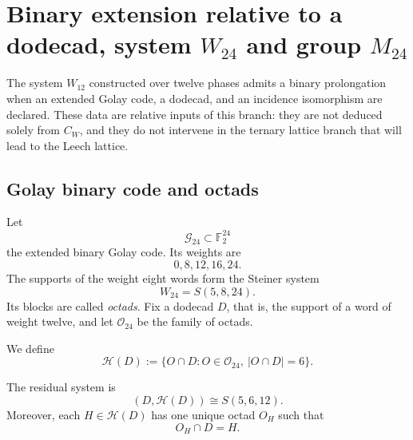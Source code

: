 
\section{Binary extension relative to a dodecad, system \texorpdfstring{\(W_{24}\)}{W24} and group \texorpdfstring{\(M_{24}\)}{M24}}
\label{p12-83-c20-s3:chap:dodecada-w24-m24}

The system \(W_{12}\) constructed over twelve phases admits a binary prolongation
when an extended Golay code, a dodecad, and an incidence
isomorphism are declared. These data are relative inputs of this branch:
they are not deduced solely from \(C_W\), and they do not intervene in the ternary lattice
branch that will lead to the Leech lattice.

\subsection{Golay binary code and octads}

Let
\[
 \mathcal G_{24}\subset\mathbb F_2^{24}
\]
the extended binary Golay code. Its weights are
\begin{equation}
 0, 8, 12, 16, 24.
 \label{p12-83-c20-s3:eq:pesos-golay-binario-extendido}
\end{equation}
The supports of the weight eight words form the Steiner system
\begin{equation}
 W_{24}=S(5,8,24).
 \label{p12-83-c20-s3:eq:w24-steiner-octadas}
\end{equation}
Its blocks are called \emph{octads}. Fix a dodecad \(D\), that is,
the support of a word of weight twelve, and let \(\mathcal O_{24}\)
be the family of octads.

We define
\begin{equation}
 \mathcal H(D)
 :=\{O\cap D:O\in\mathcal O_{24},\ |O\cap D|=6\}.
 \label{p12-83-c20-s3:eq:hexadas-residuales-dodecada}
\end{equation}

\begin{theorem}
\label{p12-83-c20-s3:thm:diseno-residual-dodecada-autonomo}
The residual system is
\begin{equation}
 \boxed{(D,\mathcal H(D))\cong S(5,6,12).}
 \label{p12-83-c20-s3:eq:diseno-residual-dodecada-w12}
\end{equation}
Moreover, each \(H\in\mathcal H(D)\) has one unique octad \(O_H\) such that
\begin{equation}
 O_H\cap D=H.
 \label{p12-83-c20-s3:eq:elevacion-unica-hexada-octada}
\end{equation}
\end{theorem}

